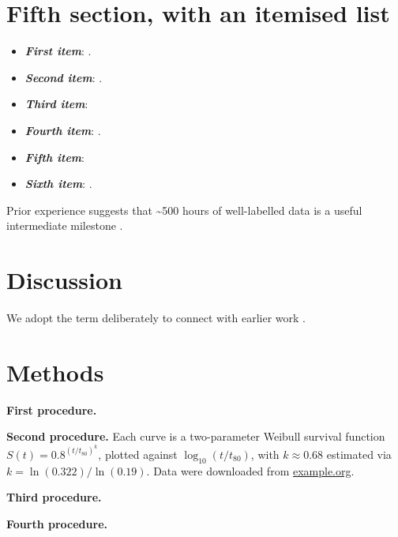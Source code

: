\documentclass[10pt,twocolumn]{article}
\begin{document}
\lipsum[25]

\section{Fifth section, with an itemised list}\label{fifth-section}

\lipsum[26]

\lipsum[27][1-3]

\begin{itemize}
\item
  \emph{\textbf{First item}}: \lipsum[28][1-4] \cite{Author2019}.
\item
  \emph{\textbf{Second item}}: \lipsum[29][1-4] \cite{Author2020,Author2021}.
\item
  \emph{\textbf{Third item}}: \lipsum[30][1-3]
\item
  \emph{\textbf{Fourth item}}: \lipsum[31][1-4] \cite{Author2022}.
\item
  \emph{\textbf{Fifth item}}: \lipsum[32][1-3]
\item
  \emph{\textbf{Sixth item}}: \lipsum[33][1-4] \cite{Author2023}.
\end{itemize}

\lipsum[34]

\lipsum[35][1-5] Prior experience suggests that \textasciitilde500 hours
of well-labelled data is a useful intermediate milestone
\cite{Author2021}. \lipsum[35][6-8]

\lipsum[36]

\section{Discussion}\label{discussion}

\lipsum[37]

\lipsum[38][1-4] We adopt the term deliberately to connect with earlier
work \cite{Author2019,Author2020,Author2023}. \lipsum[38][5-8]

\lipsum[39]

\section{Methods}\label{methods}

\textbf{First procedure.} \lipsum[40][1-5]

\textbf{Second procedure.} \lipsum[41][1-3] Each curve is a
two-parameter Weibull survival function $S(t) = 0.8^{(t/t_{80})^k}$,
plotted against $\log_{10}(t/t_{80})$, with $k \approx 0.68$ estimated
via $k = \ln(0.322)/\ln(0.19)$. Data were downloaded from
\href{https://example.org/}{example.org}. \lipsum[41][4-5]

\textbf{Third procedure.} \lipsum[42][1-5] \cite{Author2022}

\textbf{Fourth procedure.} \lipsum[43][1-5]


\end{document}
